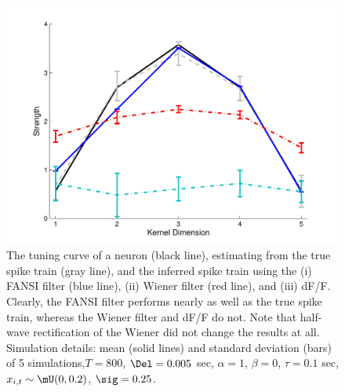\begin{figure}[H]
\centering \includegraphics[width=.9\linewidth]{../figs/kernel}
\caption{The tuning curve of a neuron (black line), estimating from the true spike train (gray line), and the inferred spike train using the (i) FANSI filter (blue line), (ii) Wiener filter (red line), and (iii) dF/F.  Clearly, the FANSI filter performs nearly as well as the true spike train, whereas the Wiener filter and dF/F do not.  Note that half-wave rectification of the Wiener did not change the results at all.  Simulation details: mean (solid lines) and standard deviation (bars) of 5 simulations,$T=800$, $\Del=0.005$ sec, $\alpha=1$, $\beta=0$, $\tau=0.1$ sec, $x_{i,t} \sim \mU(0,0.2)$,  $\sig=0.25$.} \label{fig:kernel}
\end{figure}



